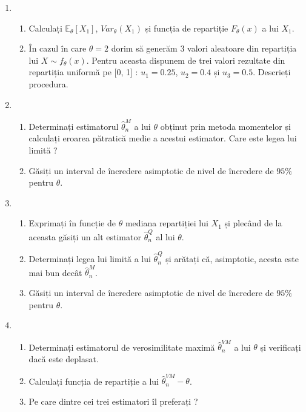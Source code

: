 \documentclass[]{article}
\def\EE{{\mathbb E}}
\begin{document}
\begin{enumerate}
\def\labelenumi{\arabic{enumi}.}
\item
  \begin{enumerate}
  \def\labelenumii{\alph{enumii})}
  \item
    Calculați \(\EE_{\theta}[X_1]\), \(Var_{\theta}(X_1)\) și funcția de
    repartiție \(F_{\theta}(x)\) a lui \(X_1\).
  \item
    În cazul în care \(\theta = 2\) dorim să generăm \(3\) valori
    aleatoare din repartiția lui \(X\sim f_{\theta}(x)\). Pentru aceasta
    dispunem de trei valori rezultate din repartiția uniformă pe {[}0,
    1{]} : \(u_1 = 0.25\), \(u_2 = 0.4\) și \(u_3 = 0.5\). Descrieți
    procedura.
  \end{enumerate}
\item
  \begin{enumerate}
  \def\labelenumii{\alph{enumii})}
  \item
    Determinați estimatorul \(\hat{\theta}_{n}^M\) a lui \(\theta\)
    obținut prin metoda momentelor și calculați eroarea pătratică medie
    a acestui estimator. Care este legea lui limită ?
  \item
    Găsiți un interval de încredere asimptotic de nivel de încredere de
    \(95\%\) pentru \(\theta\).
  \end{enumerate}
\item
  \begin{enumerate}
  \def\labelenumii{\alph{enumii})}
  \item
    Exprimați în funcție de \(\theta\) mediana repartiției lui \(X_1\)
    și plecând de la aceasta găsiți un alt estimator
    \(\hat{\theta}_{n}^Q\) al lui \(\theta\).
  \item
    Determinați legea lui limită a lui \(\hat{\theta}_{n}^Q\) și arătați
    că, asimptotic, acesta este mai bun decât \(\hat{\theta}_{n}^M\).
  \item
    Găsiți un interval de încredere asimptotic de nivel de încredere de
    \(95\%\) pentru \(\theta\).
  \end{enumerate}
\item
  \begin{enumerate}
  \def\labelenumii{\alph{enumii})}
  \item
    Determinați estimatorul de verosimilitate maximă
    \(\hat{\theta}_{n}^{VM}\) a lui \(\theta\) și verificați dacă este
    deplasat.
  \item
    Calculați funcția de repartiție a lui
    \(\hat{\theta}_{n}^{VM}-\theta\).
  \item
    Pe care dintre cei trei estimatori îl preferați ?
  \end{enumerate}
\end{enumerate}
\end{document}
